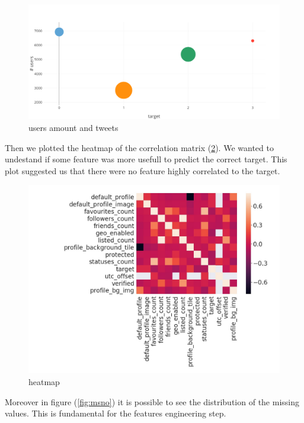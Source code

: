 \begin{figure}[htp!]
	\centering
	\includegraphics[width=\columnwidth]{chapter3/figure/bubble.png}
	\caption{users amount and tweets}
	\label{fig:bubble}
\end{figure}
\newpage
Then we plotted the heatmap of the correlation matrix (\ref{fig:heatmap}). We wanted to undestand if some feature was more usefull to predict the correct target. This plot suggested us that there were no feature highly correlated to the target.
\begin{figure}[htp!]
	\centering
	\includegraphics[width=\columnwidth]{chapter3/figure/heatmap.jpg}
	\caption{heatmap}
	\label{fig:heatmap}
\end{figure}

Moreover in figure (\ref{fig:msno}) it is possible to see the distribution of the missing values. This is fundamental for the features engineering step.

